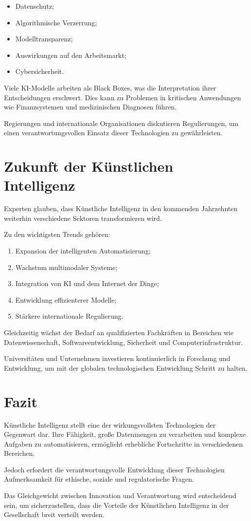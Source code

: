 \documentclass[11pt]{article}
\begin{document}
\begin{itemize}
    \item Datenschutz;
    \item Algorithmische Verzerrung;
    \item Modelltransparenz;
    \item Auswirkungen auf den Arbeitsmarkt;
    \item Cybersicherheit.
\end{itemize}

Viele KI-Modelle arbeiten als Black Boxes, was die Interpretation ihrer Entscheidungen erschwert.
Dies kann zu Problemen in kritischen Anwendungen wie Finanzsystemen und medizinischen
Diagnosen führen.

Regierungen und internationale Organisationen diskutieren Regulierungen, um einen verantwortungsvollen
Einsatz dieser Technologien zu gewährleisten. 

\section{Zukunft der Künstlichen Intelligenz}

Experten glauben, dass Künstliche Intelligenz in den kommenden Jahrzehnten weiterhin verschiedene Sektoren
transformieren wird.

Zu den wichtigsten Trends gehören:

\begin{enumerate}
    \item Expansion der intelligenten Automatisierung;
    \item Wachstum multimodaler Systeme;
    \item Integration von KI und dem Internet der Dinge;
    \item Entwicklung effizienterer Modelle;
    \item Stärkere internationale Regulierung.
\end{enumerate}

Gleichzeitig wächst der Bedarf an qualifizierten Fachkräften in Bereichen wie
Datenwissenschaft, Softwareentwicklung, Sicherheit und Computerinfrastruktur.

Universitäten und Unternehmen investieren kontinuierlich in Forschung und Entwicklung, um
mit der globalen technologischen Entwicklung Schritt zu halten. 

\section{Fazit}

Künstliche Intelligenz stellt eine der wirkungsvollsten Technologien der Gegenwart dar. Ihre
Fähigkeit, große Datenmengen zu verarbeiten und komplexe Aufgaben zu automatisieren, ermöglicht
erhebliche Fortschritte in verschiedenen Bereichen.

Jedoch erfordert die verantwortungsvolle Entwicklung dieser Technologien Aufmerksamkeit für ethische,
soziale und regulatorische Fragen.

Das Gleichgewicht zwischen Innovation und Verantwortung wird entscheidend sein, um sicherzustellen, dass die Vorteile
der Künstlichen Intelligenz in der Gesellschaft breit verteilt werden. 
\end{document}

